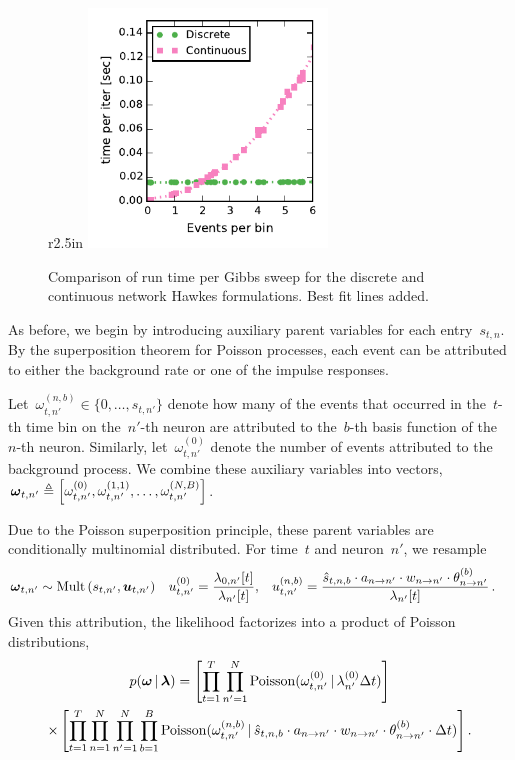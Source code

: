 \begin{figure}{r}{2.5in}
  \centering
  \includegraphics[width=2.5in]{figures/ch2b/discrete_cont_comparison}
  \caption[Runtime comparison of continuous and discrete time Hawkes models]{
    Comparison of run time per Gibbs sweep for the discrete and continuous network Hawkes formulations. Best fit lines added.}
  \label{fig:disc_vs_cont}
\end{figure}

As before, we begin by introducing auxiliary parent variables for each
entry~$s_{t,n}$.  By the superposition theorem for Poisson processes,
each event can be attributed to either the background rate or one of
the impulse responses.

Let~${\omega_{t,n'}^{(n,b)} \in \{0,\ldots, s_{t,n'}\}}$ denote how
many of the events that occurred in the~$t$-th time bin on the~$n'$-th
neuron are attributed to the~$b$-th basis function of the~$n$-th
neuron.  Similarly, let~${\omega_{t,n'}^{(0)}}$ denote the number of
events attributed to the background process. We combine these
auxiliary variables into vectors,~${\boldsymbol{\omega}_{t,n'}\triangleq
  \left[\omega_{t,n'}^{(0)}, \omega_{t,n'}^{(1,1)}, \ldots,
    \omega_{t,n'}^{(N,B)} \right]}$.

Due to the Poisson superposition principle, these parent variables are
conditionally multinomial distributed.  For time~$t$ and neuron~$n'$,
we resample
\begin{align*}
\boldsymbol{\omega}_{t,n'} &\sim \mathrm{Mult} \left(s_{t,n'}, \boldsymbol{u}_{t,n'} \right) & 
u_{t,n'}^{(0)} &= \frac{\lambda_{0,n'}[t]}{\lambda_{n'}[t]}, &
u_{t,n'}^{(n,b)} &= \frac{\hat{s}_{t,n,b} \cdot a_{n \to n'} \cdot w_{n \to n'} \cdot \theta_{n \to n'}^{(b)}}{\lambda_{n'}[t]}\, .
\end{align*}
Given this attribution, the likelihood factorizes into a product of
Poisson distributions,
\begin{multline*}
  p(\boldsymbol{\omega} \,|\, \boldsymbol{\lambda}) =
  \left[\prod_{t=1}^T \prod_{n'=1}^N \mathrm{Poisson}(\omega_{t,n'}^{(0)} \,|\, \lambda_{n'}^{(0)} \Delta t)\right]  \\
  \times
  \left[ \prod_{t=1}^T \prod_{n=1}^N \prod_{n'=1}^N \prod_{b=1}^B
    \mathrm{Poisson}(\omega_{t,n'}^{(n,b)} \,|\,
    \hat{s}_{t,n,b} \cdot a_{n \to n'} \cdot w_{n \to n'} \cdot \theta_{n\to n'}^{(b)} \cdot \Delta t)\right].
\end{multline*}

